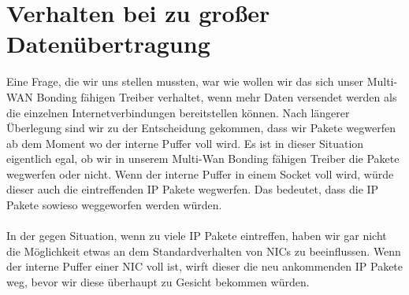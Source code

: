 \section{Verhalten bei zu großer Datenübertragung}
Eine Frage, die wir uns stellen mussten, war wie wollen wir das sich unser Multi-WAN Bonding fähigen Treiber verhaltet, wenn mehr Daten versendet werden als die einzelnen Internetverbindungen bereitstellen können. Nach längerer Überlegung sind wir zu der Entscheidung gekommen, dass wir Pakete wegwerfen ab dem Moment wo der interne Puffer voll wird. Es ist in dieser Situation eigentlich egal, ob wir in unserem Multi-Wan Bonding fähigen Treiber die Pakete wegwerfen oder nicht. Wenn der interne Puffer in einem Socket voll wird, würde dieser auch die eintreffenden IP Pakete wegwerfen. Das bedeutet, dass die IP Pakete sowieso weggeworfen werden würden.
\\\\
In der gegen Situation, wenn zu viele IP Pakete eintreffen, haben wir gar nicht die Möglichkeit etwas an dem Standardverhalten von NICs zu beeinflussen. Wenn der interne Puffer einer NIC voll ist, wirft dieser die neu ankommenden IP Pakete weg, bevor wir diese überhaupt zu Gesicht bekommen würden.